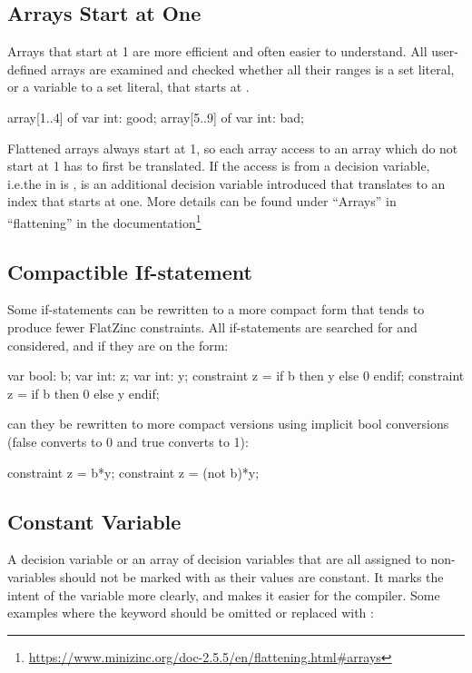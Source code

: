 \documentclass[a4paper,12pt]{article}
\newcommand{\mi}[1]{\mbox{\mzninline{#1}}}
\begin{document}
\subsection{Arrays Start at One}\label{sec:rule:arrayatone}
Arrays that start at 1 are more efficient and often easier to understand.
All user-defined arrays are examined and checked whether all their ranges is a set
literal, or a variable to a set literal, that starts at \mi{1}.
\begin{mznnobreak}
array[1..4] of var int: good;
array[5..9] of var int: bad;
\end{mznnobreak}
Flattened arrays always start at 1, so each array access to an array which do not start at
1 has to first be translated. If the access is from a decision variable, i.e.\@ the \mi{i} in \mi{a[i]} is
\mi{var}, is an additional decision variable introduced that translates \mi{i} to an index that
starts at one. More details can be found under ``Arrays'' in ``flattening'' in the
documentation\footnote{\url{https://www.minizinc.org/doc-2.5.5/en/flattening.html\#arrays}}

\subsection{Compactible If-statement}\label{sec:rule:compactif}
Some if-statements can be rewritten to a more compact form that tends to produce fewer
FlatZinc constraints. All if-statements are searched for and considered, and if they are on
the form:
\begin{mznnobreak}
var bool: b; var int: z; var int: y;
constraint z = if b then y else 0 endif;
constraint z = if b then 0 else y endif;
\end{mznnobreak}

can they be rewritten to more compact versions using implicit bool conversions (false converts
to 0 and true converts to 1):

\begin{mznnobreak}
constraint z = b*y;
constraint z = (not b)*y;
\end{mznnobreak}

\subsection{Constant Variable}\label{sec:rule:constvar}
A decision variable or an array of decision variables that are all assigned to non-variables should not be
marked with \mi{var} as their values are constant. It marks the intent of the variable more
clearly, and makes it easier for the compiler. Some examples where the keyword \mi{var}
should be omitted or replaced with \mi{par}:
\end{document}

